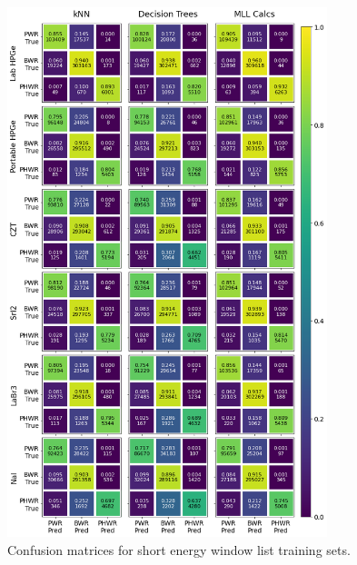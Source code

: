 \begin{figure}[!htb]
  \centering
  \includegraphics[width=0.83\textwidth]{./chapters/exp2/confusion_matrix_6dets_short.png}
  \caption{Confusion matrices for short energy window list training sets.}
  \label{fig:cm_short}
\end{figure}

